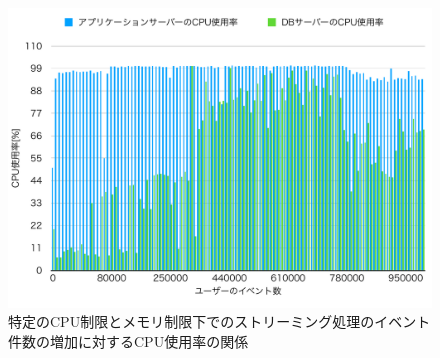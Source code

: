 \documentclass[../../../../../main]{subfiles}
\begin{document}
    \begin{figure}[H]
        \centering
        \includegraphics[width=12cm]{graph}
        \caption{特定のCPU制限とメモリ制限下でのストリーミング処理のイベント件数の増加に対するCPU使用率の関係}
        \label{fig:stream-cpu-app_1_1024-db_1_1024}
    \end{figure}
\end{document}
